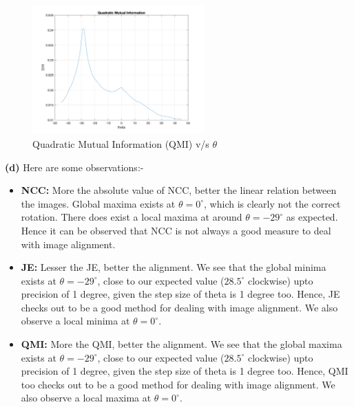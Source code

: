 \documentclass[12pt]{article}
\begin{document}
    \vspace{-25pt}
    
    \begin{figure}[H]
        \centering
        \includegraphics[width=0.59\textwidth]{../images/QMI.png}
        \vspace{-10pt}
        \caption{Quadratic Mutual Information (QMI) v/s $\theta$}
    \end{figure}
    
    \textbf{(d)} Here are some observations:-
    
    \vspace{-10pt}
    
    \begin{itemize}[itemsep=0em]
        \item \textbf{NCC:} More the absolute value of NCC, better the linear relation between the images. Global maxima exists at $\theta = 0^{\circ}$, which is clearly not the correct rotation. There does exist a local maxima at around $\theta = -29^{\circ}$ as expected. Hence it can be observed that NCC is not always a good measure to deal with image alignment.
        \item \textbf{JE:} Lesser the JE, better the alignment. We see that the global minima exists at $\theta = -29^{\circ}$, close to our expected value ($28.5^{\circ}$ clockwise) upto precision of 1 degree, given the step size of theta is 1 degree too. Hence, JE checks out to be a good method for dealing with image alignment. We also observe a local minima at $\theta = 0^{\circ}$.
        \item \textbf{QMI:} More the QMI, better the alignment. We see that the global maxima exists at $\theta = -29^{\circ}$, close to our expected value ($28.5^{\circ}$ clockwise) upto precision of 1 degree, given the step size of theta is 1 degree too. Hence, QMI too checks out to be a good method for dealing with image alignment. We also observe a local maxima at $\theta = 0^{\circ}$.
    \end{itemize}
    
\end{document}
